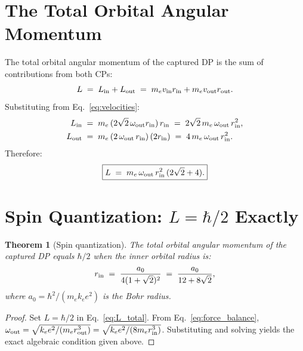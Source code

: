 \documentclass[12pt]{article}
\newtheorem{theorem}{Theorem}[section]
\newcommand{\rin}{r_{\rm in}}
\newcommand{\rout}{r_{\rm out}}
\newcommand{\oout}{\omega_{\rm out}}
\newcommand{\aBohr}{a_0}
\begin{document}
\section{The Total Orbital Angular Momentum}
\label{sec:angmom}

The total orbital angular momentum of the captured DP is the sum of
contributions from both CPs:
\begin{equation}
  L \;=\; L_{\rm in} + L_{\rm out}
  \;=\; m_e v_{\rm in}\rin + m_e v_{\rm out}\rout.
  \label{eq:L_sum}
\end{equation}
Substituting from Eq.~\eqref{eq:velocities}:
\begin{align}
  L_{\rm in} &\;=\; m_e\,(2\sqrt{2}\,\oout\rin)\,\rin
  \;=\; 2\sqrt{2}\,m_e\,\oout\,\rin^2, \notag\\
  L_{\rm out} &\;=\; m_e\,(2\,\oout\,\rin)\,(2\rin)
  \;=\; 4\,m_e\,\oout\,\rin^2.
  \label{eq:L_parts}
\end{align}
Therefore:
\begin{equation}
  \boxed{L \;=\; m_e\,\oout\,\rin^2\,(2\sqrt{2}+4).}
  \label{eq:L_total}
\end{equation}

\section{Spin Quantization: $L = \hbar/2$ Exactly}
\label{sec:quantization}

\begin{theorem}[Spin quantization]
\label{thm:spin}
The total orbital angular momentum of the captured DP equals $\hbar/2$
when the inner orbital radius is:
\begin{equation}
  \rin \;=\; \frac{\aBohr}{4(1+\sqrt{2})^2}
  \;=\; \frac{\aBohr}{12+8\sqrt{2}},
  \label{eq:rin}
\end{equation}
where $\aBohr = \hbar^2/(m_e k_e e^2)$ is the Bohr radius.
\end{theorem}

\begin{proof}
Set $L = \hbar/2$ in Eq.~\eqref{eq:L_total}.  From
Eq.~\eqref{eq:force_balance}, $\oout = \sqrt{k_e e^2/(m_e\rout^3)} =
\sqrt{k_e e^2/(8m_e\rin^3)}$.  Substituting and solving yields the
exact algebraic condition given above.
\end{proof}
\end{document}

